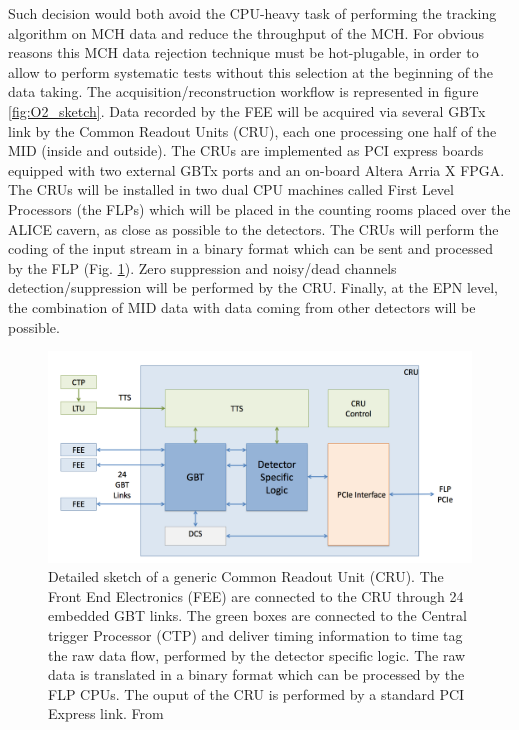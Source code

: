 Such decision would both avoid the CPU-heavy task of performing the tracking algorithm on MCH data and reduce the throughput of the MCH.
For obvious reasons this MCH data rejection technique must be hot-plugable, in order to allow to perform systematic tests without this selection at the beginning of the data taking.
The acquisition/reconstruction workflow is represented in figure \ref{fig:O2_sketch}.
Data recorded by the FEE will be acquired via several GBTx link by the Common Readout Units (CRU), each one processing one half of the MID (inside and outside).
The CRUs are implemented as PCI express boards equipped with two external GBTx ports and an on-board Altera Arria X FPGA.
The CRUs will be installed in two dual CPU machines called First Level Processors (the FLPs) which will be placed in the counting rooms placed over the ALICE cavern, as close as possible to the detectors.
The CRUs will perform the coding of the input stream in a binary format which can be sent and processed by the FLP (Fig. \ref{fig:O2_CRU}).
Zero suppression and noisy/dead channels detection/suppression will be performed by the CRU.
Finally, at the EPN level, the combination of MID data with data coming from other detectors will be possible.

\begin{figure}[!ht]
\begin{center}
\includegraphics[width=0.9\linewidth]{Chapters/O2/Figs/CRU.pdf}
\caption{Detailed sketch of a generic Common Readout Unit (CRU). The Front End Electronics (FEE) are connected to the CRU through 24 embedded GBT links. The green boxes are connected to the Central trigger Processor (CTP) and deliver timing information to time tag the raw data flow, performed by the detector specific logic. The raw data is translated in a binary format which can be processed by the FLP CPUs. The ouput of the CRU is performed by a standard PCI Express link. From \cite{Buncic:2011297}}
\label{fig:O2_CRU}
\end{center}
\end{figure}


